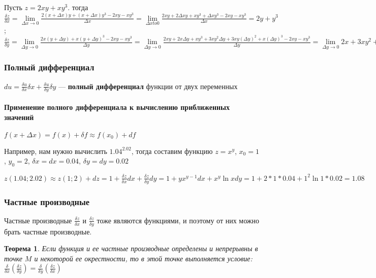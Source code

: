 \documentclass{article}
\newtheorem{theorem}{Теорема}
\begin{document}
\hfill

Пусть $z = 2xy + xy^3$. тогда $\frac{\delta z}{\delta x} = \lim\limits_{\Delta x \to 0} \frac{2(x + \Delta x)y + (x + \Delta x)y^3 - 2xy - xy^3}{\Delta x} = \lim\limits_{\Delta x to 0} \frac{2xy + 2 \Delta x y + xy^3 + \Delta x y^3 - 2xy - xy^3}{\Delta x} = 2y + y^3$; $\frac{\delta z}{\delta y} = \lim\limits_{\Delta y \to 0} \frac{2x(y + \Delta y) + x(y + \Delta y)^3 - 2xy - xy^3}{\Delta y} = \lim\limits_{\Delta y \to 0} \frac{2xy + 2x \Delta y + xy^3 + 3xy^2 \Delta y + 3xy (\Delta y)^2 + x (\Delta y)^3 - 2xy - xy^3}{\Delta y} = \lim\limits_{\Delta y \to 0} 2x + 3xy^2 + 3xy \Delta y + x (\Delta y)^2 = 2x + 3xy^2$

\subsubsection{Полный дифференциал}

$du = \frac{\delta u}{\delta x} \delta x + \frac{\delta u}{\delta y} \delta y$ — \textbf{полный дифференциал} функции от двух переменных

\paragraph{Применение полного дифференциала к вычислению приближенных значений}

\hfill

\hfill

$f(x + \Delta x) = f(x) + \delta f \approx f(x_0) + d f$

Например, нам нужно вычислить $1.04^{2.02}$, тогда составим функцию $z = x^y$, $x_0 = 1$, $y_0 = 2$, $\delta x = d x = 0.04$, $\delta y = d y = 0.02$

$z(1.04; 2.02) \approx z(1; 2) + d z = 1 + \frac{\delta z}{\delta x} dx + \frac{\delta z}{\delta y} dy = 1 + yx^{y - 1} dx + x^y \ln x d y = 1 + 2 * 1 * 0.04 + 1^2 \ln 1 * 0.02 = 1.08$

\subsubsection{Частные производные}

Частные производные $\frac{\delta z}{\delta x}$ и $\frac{\delta z}{\delta y}$ тоже являются функциями, и поэтому от них можно брать частные производные.

\begin{theorem}

Если функция и ее частные производные определены и непрерывны в точке $M$ и некоторой ее окрестности, то в этой точке выполняется условие: $\frac{\delta}{\delta x} (\frac{\delta z}{\delta y}) = \frac{\delta}{\delta y} (\frac{\delta z}{\delta x})$

\end{theorem}
\end{document}
